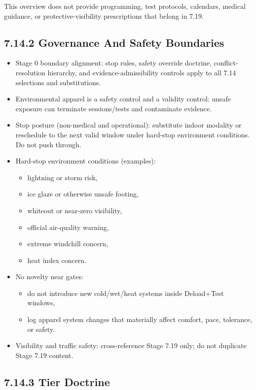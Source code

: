 \documentclass[10pt]{article}
\begin{document}
This overview does not provide programming, test protocols, calendars, medical guidance, or protective-visibility prescriptions that belong in 7.19.

\subsection*{7.14.2 Governance And Safety Boundaries}
{}

\begin{itemize}
\item Stage 0 boundary alignment: stop rules, safety override doctrine, conflict-resolution hierarchy, and evidence-admissibility controls apply to all 7.14 selections and substitutions.
\item Environmental apparel is a safety control and a validity control: unsafe exposure can terminate sessions/tests and contaminate evidence.
\item Stop posture (non-medical and operational): substitute indoor modality or reschedule to the next valid window under hard-stop environment conditions. Do not push through.
\item Hard-stop environment conditions (examples):
  \begin{itemize}
  \item lightning or storm risk,
  \item ice glaze or otherwise unsafe footing,
  \item whiteout or near-zero visibility,
  \item official air-quality warning,
  \item extreme windchill concern,
  \item heat index concern.
  \end{itemize}
\item No novelty near gates:
  \begin{itemize}
  \item do not introduce new cold/wet/heat systems inside Deload+Test windows,
  \item log apparel system changes that materially affect comfort, pace, tolerance, or safety.
  \end{itemize}
\item Visibility and traffic safety: cross-reference Stage 7.19 only; do not duplicate Stage 7.19 content.
\end{itemize}

\subsection*{7.14.3 Tier Doctrine}
{}
\end{document}
